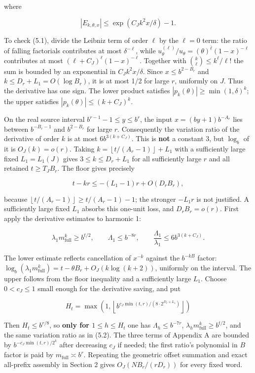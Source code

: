 \documentclass[11pt,a4paper]{article}
\begin{document}
where

\[
|E_{k,\theta,x}| \le  \exp(C_J k^2 x/\delta)-1.\tag{5.1}
\]

To check (5.1), divide the Leibniz term of order \(\ell\) by the
\(\ell=0\) term: the ratio of falling factorials contributes at most
\(\delta^{-\ell}\), while
\(u_\theta^{(\ell)}/u_\theta=(\theta)^{\overline{\ell}}(1-x)^{-\ell}\)
contributes at most \((\ell+C_J)^\ell(1-x)^{-\ell}\). Together with
\(\binom{k}{\ell}\le k^\ell/\ell!\) the sum is bounded by an exponential
in \(C_J k^2 x/\delta\). Since \(x\le b^{2-B_r}\) and
\(k\le D_r+L_1=O(\log B_r)\), it is at most 1/2 for large \(r\),
uniformly on \(J\). Thus the derivative has one sign. The lower product
satisfies \(|p_k(\theta)|\ge \min(1,\delta)^k\); the upper satisfies
\(|p_k(\theta)|\le (k+C_J)^k\).

On the real source interval \(b^{r-1}-1\le y\le b^r\), the input
\(x=(by+1)b^{-A_r}\) lies between \(b^{-B_r-1}\) and \(b^{2-B_r}\) for
large \(r\). Consequently the variation ratio of the derivative of order
\(k\) is at most \(6 b^{3(k+C_J)}\). This is \textbf{not} a constant 3,
but \(\log_b\) of it is \(O_J(k)=o(r)\). Taking
\(k=\left\lfloor t/(A_r-1)\right\rfloor+L_1\) with a sufficiently large
fixed \(L_1=L_1(J)\) gives \(3\le k\le D_r+L_1\) for all sufficiently
large \(r\) and all retained \(t\ge T_J B_r\). The floor gives precisely

\[
t-k r \le  -(L_1-1)r+O(D_r B_r),
\]

because \(\left\lfloor t/(A_r-1)\right\rfloor\ge t/(A_r-1)-1\); the
stronger \(-L_1 r\) is not justified. A sufficiently large fixed \(L_1\)
absorbs this one-unit loss, and \(D_r B_r=o(r)\). First apply the
derivative estimates to harmonic 1:

\[
\lambda_1 m_{\mathrm{full}}^k \ge  b^{t/2},\qquad \Lambda_1\le b^{-8r},\qquad
\frac{\Lambda_1}{\lambda_1} \le  6b^{3(k+C_J)}.\tag{5.2}
\]

The lower estimate reflects cancellation of \(x^{-k}\) against the
\(b^{-k B}\) factor:
\(\log_b(\lambda_1 m_{\mathrm{full}}^k) = t - \theta B_r + O_J(k \log(k+2))\),
uniformly on the interval. The upper follows from the floor inequality
and a sufficiently large \(L_1\). Choose \(0< c_J\le 1\) small enough
for the derivative saving, and put

\[
H_t=\max(1,\left\lfloor b^{c_J \min(t,r)/(8\cdot 2^{D_r+L_1})}\right\rfloor)
\]

Then \(H_t\le b^{r/8}\), so \textbf{only for \(1\le h\le H_t\)} one has
\(\Lambda_h\le b^{-7r}\), \(\lambda_h m_{\mathrm{full}}^k\ge b^{t/2}\),
and the same variation ratio as in (5.2). The three terms of Appendix A
are bounded by \(b^{-c_J \min(t,r)/2^k}\) after decreasing \(c_J\) if
needed; the first ratio's polynomial in \(B\) factor is paid by
\(m_{\mathrm{full}}\asymp b^r\). Repeating the geometric offset
summation and exact all-prefix assembly in Section 2 gives
\(O_J(N B_r/(rD_r))\) for every fixed word.
\end{document}
